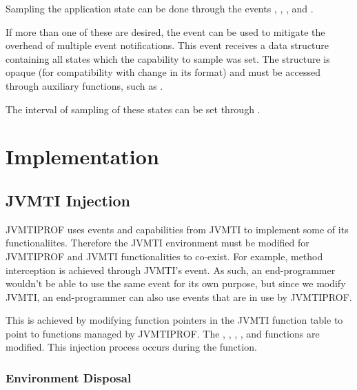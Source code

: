 Sampling the application state can be done through the events , , ,  and .

If more than one of these are desired, the  event can be used to mitigate the overhead of multiple event notifications. This event receives a data structure containing all states which the capability to sample was set. The structure is opaque (for compatibility with change in its format) and must be accessed through auxiliary functions, such as .

The interval of sampling of these states can be set through .

\section{Implementation} \label{sec:impl}

\subsection{JVMTI Injection}

JVMTIPROF uses events and capabilities from JVMTI to implement some of its functionaliites. Therefore the JVMTI environment must be modified for JVMTIPROF and JVMTI functionalities to co-exist. For example, method interception is achieved through JVMTI's  event. As such, an end-programmer wouldn't be able to use the same event for its own purpose, but since we modify JVMTI, an end-programmer can also use events that are in use by JVMTIPROF.

This is achieved by modifying function pointers in the JVMTI function table to point to functions managed by JVMTIPROF. The , , , ,  and  functions are modified. This injection process occurs during the  function.

\subsubsection*{Environment Disposal}

